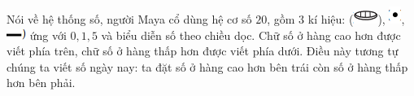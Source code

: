 	Nói về hệ thống số,  người Maya  cổ dùng hệ cơ số $20$, gồm $3$ kí hiệu:  (\includegraphics{29}),  \includegraphics{30}, \includegraphics{31}  ứng với $0,1, 5$ và biểu diễn số theo chiều dọc. Chữ số ở hàng cao hơn được viết phía trên, chữ số ở hàng thấp hơn được viết phía dưới. Điều này tương tự chúng ta viết số ngày nay: ta đặt số ở hàng cao hơn bên trái còn số ở hàng thấp hơn bên phải. 
	\begin{table}[H]
		\vspace*{-5pt}
	\vspace*{-5pt}
	\end{table}
